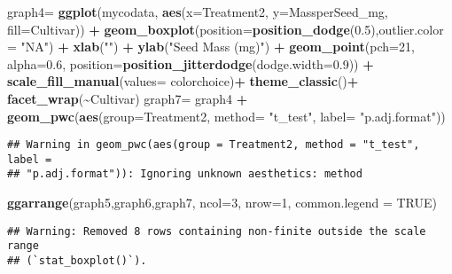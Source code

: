 \documentclass[
]{article}
\newenvironment{Shaded}{\begin{snugshade}}{\end{snugshade}}
\newcommand{\AttributeTok}[1]{\textcolor[rgb]{0.13,0.29,0.53}{#1}}
\newcommand{\ConstantTok}[1]{\textcolor[rgb]{0.56,0.35,0.01}{#1}}
\newcommand{\DecValTok}[1]{\textcolor[rgb]{0.00,0.00,0.81}{#1}}
\newcommand{\FloatTok}[1]{\textcolor[rgb]{0.00,0.00,0.81}{#1}}
\newcommand{\FunctionTok}[1]{\textcolor[rgb]{0.13,0.29,0.53}{\textbf{#1}}}
\newcommand{\NormalTok}[1]{#1}
\newcommand{\OtherTok}[1]{\textcolor[rgb]{0.56,0.35,0.01}{#1}}
\newcommand{\SpecialCharTok}[1]{\textcolor[rgb]{0.81,0.36,0.00}{\textbf{#1}}}
\newcommand{\StringTok}[1]{\textcolor[rgb]{0.31,0.60,0.02}{#1}}
\begin{document}
\begin{Shaded}
\begin{Highlighting}[]
\NormalTok{graph4}\OtherTok{=} \FunctionTok{ggplot}\NormalTok{(mycodata, }\FunctionTok{aes}\NormalTok{(}\AttributeTok{x=}\NormalTok{Treatment2, }\AttributeTok{y=}\NormalTok{MassperSeed\_mg, }\AttributeTok{fill=}\NormalTok{Cultivar)) }\SpecialCharTok{+}
  \FunctionTok{geom\_boxplot}\NormalTok{(}\AttributeTok{position=}\FunctionTok{position\_dodge}\NormalTok{(}\FloatTok{0.5}\NormalTok{),}\AttributeTok{outlier.color =} \StringTok{"NA"}\NormalTok{) }\SpecialCharTok{+}
  \FunctionTok{xlab}\NormalTok{(}\StringTok{""}\NormalTok{) }\SpecialCharTok{+} \FunctionTok{ylab}\NormalTok{(}\StringTok{"Seed Mass (mg)"}\NormalTok{) }\SpecialCharTok{+}
  \FunctionTok{geom\_point}\NormalTok{(}\AttributeTok{pch=}\DecValTok{21}\NormalTok{, }\AttributeTok{alpha=}\FloatTok{0.6}\NormalTok{, }\AttributeTok{position=}\FunctionTok{position\_jitterdodge}\NormalTok{(}\AttributeTok{dodge.width=}\FloatTok{0.9}\NormalTok{)) }\SpecialCharTok{+}
  \FunctionTok{scale\_fill\_manual}\NormalTok{(}\AttributeTok{values=}\NormalTok{ colorchoice)}\SpecialCharTok{+}
  \FunctionTok{theme\_classic}\NormalTok{()}\SpecialCharTok{+}
  \FunctionTok{facet\_wrap}\NormalTok{(}\SpecialCharTok{\textasciitilde{}}\NormalTok{Cultivar)}
\NormalTok{graph7}\OtherTok{=}\NormalTok{ graph4 }\SpecialCharTok{+} \FunctionTok{geom\_pwc}\NormalTok{(}\FunctionTok{aes}\NormalTok{(}\AttributeTok{group=}\NormalTok{Treatment2, }\AttributeTok{method=} \StringTok{"t\_test"}\NormalTok{, }\AttributeTok{label=} \StringTok{"p.adj.format"}\NormalTok{))}
\end{Highlighting}
\end{Shaded}

\begin{verbatim}
## Warning in geom_pwc(aes(group = Treatment2, method = "t_test", label =
## "p.adj.format")): Ignoring unknown aesthetics: method
\end{verbatim}

\begin{Shaded}
\begin{Highlighting}[]
\FunctionTok{ggarrange}\NormalTok{(graph5,graph6,graph7, }\AttributeTok{ncol=}\DecValTok{3}\NormalTok{, }\AttributeTok{nrow=}\DecValTok{1}\NormalTok{, }\AttributeTok{common.legend =} \ConstantTok{TRUE}\NormalTok{)}
\end{Highlighting}
\end{Shaded}

\begin{verbatim}
## Warning: Removed 8 rows containing non-finite outside the scale range
## (`stat_boxplot()`).
\end{verbatim}
\end{document}
